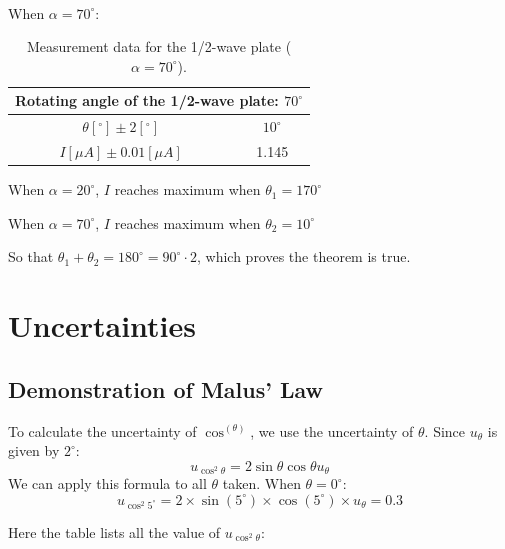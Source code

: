 \documentclass[12pt, a4paper]{article}
\begin{document}
~\\

When $\alpha = 70^{\circ}$:
\begin{table}[!h]
	\begin{center}
	\begin{tabular}{|c|c|}
	\hline
	\multicolumn{2}{|c|}{Rotating angle of the 1/2-wave plate: $70^\circ$}\\
	\hline
	$\theta[^\circ]\pm2[^\circ]$		&	$10^\circ$	\\
	\hline
	$I[\mu A]\pm0.01[\mu A]$	&	1.145	\\
	\hline
	\end{tabular}
	\caption{Measurement data for the 1/2-wave plate ($\alpha = 70^\circ$).}
	\label{tab-0}
	\end{center}
\end{table}

When $\alpha = 20^{\circ}$, $I$ reaches maximum when $\theta_1 = 170^{\circ}$

When $\alpha = 70^{\circ}$, $I$ reaches maximum when $\theta_2 = 10^{\circ}$

So that $\theta_1 + \theta_2 = 180^{\circ} = 90^{\circ}\cdot 2$, which proves the theorem is true.

\section{Uncertainties}
\subsection{Demonstration of Malus' Law}

To calculate the uncertainty of $\cos^(\theta)$, we use the 
uncertainty of $\theta$. Since $u_{\theta}$ is given by $2^{\circ}$:
$$
	u_{\cos^2\theta} = 2\sin\theta\cos\theta u_{\theta}
$$
We can apply this formula to all $\theta$ taken. When $\theta=0^{\circ}$:
$$
	u_{\cos^2 5^{\circ}} = 2 \times \sin(5^{\circ}) \times \cos(5^{\circ}) \times u_{\theta} = 0.3
$$

Here the table lists all the value of $u_{\cos^2\theta}$:
\end{document}
